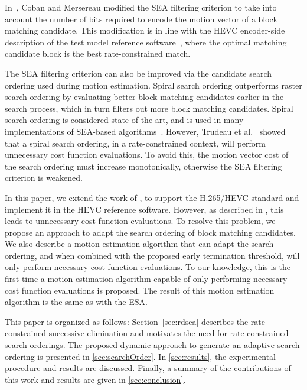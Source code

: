\documentclass{article}
\begin{document}
In~\cite{Coban1998}, Coban and Mersereau modified the SEA filtering criterion to take into account the number of bits required to encode the motion vector of a block matching candidate. This modification is in line with the HEVC encoder-side description of the test model reference software~\cite{McCann2014}, where the optimal matching candidate block is the best rate-constrained match.

The SEA filtering criterion can also be improved via the candidate search ordering used during motion estimation. Spiral search ordering outperforms raster search ordering by evaluating better block matching candidates earlier in the search process, which in turn filters out more block matching candidates. Spiral search ordering is considered state-of-the-art, and is used in many implementations of SEA-based algorithms~\cite{Zhu2005a, Coban1998, Yang2004}. However, Trudeau et al.~\cite{Trud14} showed that a spiral search ordering, in a rate-constrained context, will perform unnecessary cost function evaluations. To avoid this, the motion vector cost of the search ordering must increase monotonically, otherwise the SEA filtering criterion is weakened.

In this paper, we extend the work of \cite{Li1995}, \cite{Coban1998} to support the H.265/HEVC standard and implement it in the HEVC reference software. However, as described in \cite{Trud14}, this leads to unnecessary cost function evaluations. To resolve this problem, we propose an approach to adapt the search ordering of block matching candidates. We also describe a motion estimation algorithm that can adapt the search ordering, and when combined with the proposed early termination threshold, will only perform necessary cost function evaluations. To our knowledge, this is the first time a motion estimation algorithm capable of only performing necessary cost function evaluations is proposed. The result of this motion estimation algorithm is the same as with the ESA.

This paper is organized as follows: Section~\ref{sec:rdsea} describes the rate-constrained successive elimination and motivates the need for rate-constrained search orderings. The proposed dynamic approach to generate an adaptive search ordering is presented in \autoref{sec:searchOrder}. In \autoref{sec:results}, the experimental procedure and results are discussed. Finally, a summary of the contributions of this work and results are given in \autoref{sec:conclusion}.
\end{document}
